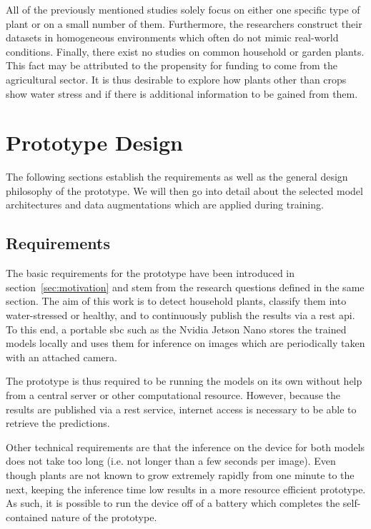 \documentclass[draft,final]{vutinfth} %
\begin{document}
All of the previously mentioned studies solely focus on either one
specific type of plant or on a small number of them. Furthermore, the
researchers construct their datasets in homogeneous environments which
often do not mimic real-world conditions. Finally, there exist no
studies on common household or garden plants. This fact may be
attributed to the propensity for funding to come from the agricultural
sector. It is thus desirable to explore how plants other than crops
show water stress and if there is additional information to be gained
from them.

\chapter{Prototype Design}
\label{chap:design}

The following sections establish the requirements as well as the
general design philosophy of the prototype. We will then go into
detail about the selected model architectures and data augmentations
which are applied during training.

\section{Requirements}
\label{sec:requirements}

The basic requirements for the prototype have been introduced in
section~\ref{sec:motivation} and stem from the research questions
defined in the same section. The aim of this work is to detect
household plants, classify them into water-stressed or healthy, and to
continuously publish the results via a \gls{rest} \gls{api}. To this
end, a portable \gls{sbc} such as the Nvidia Jetson Nano stores the
trained models locally and uses them for inference on images which are
periodically taken with an attached camera.

The prototype is thus required to be running the models on its own
without help from a central server or other computational
resource. However, because the results are published via a \gls{rest}
service, internet access is necessary to be able to retrieve the
predictions.

Other technical requirements are that the inference on the device for
both models does not take too long (i.e. not longer than a few seconds
per image). Even though plants are not known to grow extremely rapidly
from one minute to the next, keeping the inference time low results in
a more resource efficient prototype. As such, it is possible to run
the device off of a battery which completes the self-contained nature
of the prototype.
\end{document}
